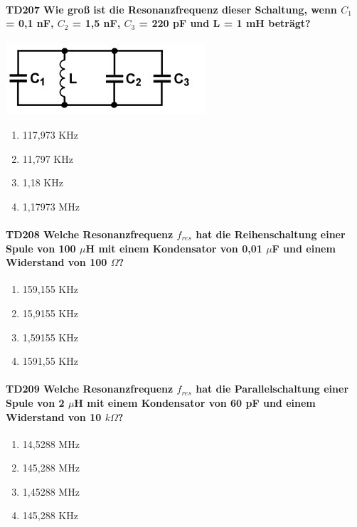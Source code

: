 \documentclass[8pt]{article}
\begin{document}
\begin{enumerate}
\begin{enumerate}[nolistsep,label=\Alph*]
{\paragraph*{TD207 Wie groß ist die Resonanzfrequenz dieser Schaltung, wenn $C_{1}$ = 0,1 nF, $C_{2}$ = 1,5 nF, $C_{3}$ = 220 pF und L = 1 mH beträgt?}
\begin{center}
	\begin{minipage}{\linewidth}
		\centering
		\includegraphics[scale=1.0]{pics/td207_a.jpg}
	\end{minipage}
\end{center}
\begin{enumerate}[nolistsep,label=\Alph*]
\item 117,973 KHz
\item 11,797 KHz
\item 1,18 KHz
\item 1,17973 MHz
\end{enumerate}

\paragraph*{TD208 Welche Resonanzfrequenz $f_{res}$ hat die Reihenschaltung einer Spule von 100 $\mu$H mit einem Kondensator von 0,01 $\mu$F und einem Widerstand von 100 $\Omega$?}
\begin{enumerate}[nolistsep,label=\Alph*]
\item 159,155 KHz
\item 15,9155 KHz
\item 1,59155 KHz
\item 1591,55 KHz
\end{enumerate}

\paragraph*{TD209 Welche Resonanzfrequenz $f_{res}$ hat die Parallelschaltung einer Spule von 2 $\mu$H mit einem Kondensator von 60 pF und einem Widerstand von 10 $k\Omega$?}
\begin{enumerate}[nolistsep,label=\Alph*]
\item 14,5288 MHz
\item 145,288 MHz
\item 1,45288 MHz
\item 145,288 KHz
\end{enumerate}

}
\end{enumerate}
\end{enumerate}
\end{document}
